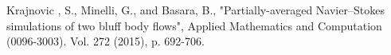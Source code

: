 \begin{thebibliography}{69}




 Krajnovic , S., Minelli, G., and Basara, B., "Partially-averaged Navier–Stokes simulations of two bluff body flows", Applied Mathematics and Computation (0096-3003). Vol. 272 (2015), p. 692-706.




\end{thebibliography}
